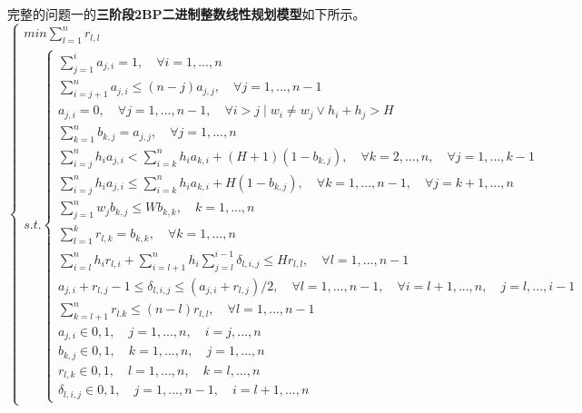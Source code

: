 \documentclass[bwprint]{gmcmthesis}
\begin{document}
完整的问题一的\textbf{三阶段2BP二进制整数线性规划模型}如下所示。
\begin{equation}
    \begin{cases}
        min \sum_{l=1}^{n}  r_{l,l} \\
        s.t.
        \begin{cases}
            \sum_{j=1}^{i}  a_{j,i} =1,\quad \forall i=1,...,n \\
            \sum_{i=j+1}^{n}  a_{j,i} \le (n-j)a_{j,j},\quad \forall j=1,...,n-1  \\
            a_{j,i}=0, \quad \forall j=1,...,n-1,\quad  \forall i>j \mid w_i \neq w_j \vee h_i+h_j>H\\
            \sum_{k=1}^{n}  b_{k,j} =a_{j,j},\quad \forall j=1,...,n  \\
            \sum_{i=j}^{n} h_ia_{j,i}<\sum_{i=k}^n h_i a_{k,i}+(H+1)(1-b_{k,j}),\quad  \forall  k=2,...,n,\quad  \forall j=1,...,k-1 \\
            \sum_{i=j}^{n} h_ia_{j,i} \le \sum_{i=k}^n h_i a_{k,i}+H(1-b_{k,j}), \quad  \forall k=1,...,n-1, \quad \forall j=k+1,...,n \\
            \sum_{j=1}^{n} w_j b_{k,j} \le W b_{k,k}, \quad k=1,...,n \\
            \sum_{l=1}^{k} r_{l,k} = b_{k,k}, \quad \forall k=1,...,n \\
            \sum_{i=l}^{n} h_i r_{l,i} +\sum_{i=l+1}^{n} h_i \sum_{j=l}^{i-1} \delta_{l,i,j} \le H r_{l,l}, \quad \forall l=1,...,n-1 \\
            a_{j,i}+r_{l,j}-1 \le \delta_{l,i,j} \le (a_{j,i}+r_{l,j})/2, \quad \forall l=1,...,n-1,\quad \forall i=l+1,...,n,\quad j=l,...,i-1 \\
           \sum_{k=l+1}^{n} r_{l.k} \le (n-l)r_{l,l}, \quad \forall l=1,...,n-1 \\
            a_{j,i} \in {0,1}, \quad j=1,...,n , \quad i=j,...,n \\
            b_{k,j} \in {0,1}, \quad k=1,...,n , \quad j=1,...,n \\
            r_{l,k} \in {0,1}, \quad l=1,...,n , \quad k=l,...,n \\
            \delta_{l,i,j} \in {0,1}, \quad j=1,...,n-1 , \quad i=l+1,...,n 
        \end{cases}  \label{问题一模型}
    \end{cases}
\end{equation}
\end{document}
